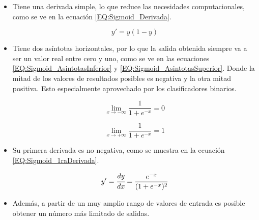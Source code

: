             \begin{itemize}
                \item Tiene una derivada simple, lo que reduce las necesidades computacionales, como se ve en la ecuación \ref{EQ:Sigmoid_Derivada}.
            
                \begin{equation}
                    \label{EQ:Sigmoid_Derivada}
                    y' = y(1 - y)
                \end{equation}
                
                \item Tiene dos asíntotas horizontales, por lo que la salida obtenida siempre va a ser un valor real entre cero y uno, como se ve en las ecuaciones \ref{EQ:Sigmoid_AsintotasInferior} y \ref{EQ:Sigmoid_AsintotasSuperior}. Donde la mitad de los valores de resultados posibles es negativa y la otra mitad positiva. Esto especialmente aprovechado por los clasificadores binarios.
                
                \begin{equation}
                    \label{EQ:Sigmoid_AsintotasInferior}
                    \lim _{x\to -\infty }{\frac {1}{1+e^{-x}}}=0
                \end{equation}
                
                \begin{equation}
                    \label{EQ:Sigmoid_AsintotasSuperior}
                    \lim _{x\to +\infty }{\frac {1}{1+e^{-x}}}=1
                \end{equation}
                
                \item Su primera derivada es no negativa, como se muestra en la ecuación \ref{EQ:Sigmoid_1raDerivada}.
                
                \begin{equation}
                    \label{EQ:Sigmoid_1raDerivada}
                    y' = {\cfrac {dy}{dx}}={\frac {e^{-x}}{(1+e^{-x})^{2}}}
                \end{equation}
            
                \item Además, a partir de un muy amplio rango de valores de entrada es posible obtener un número más limitado de salidas.
                
            \end{itemize}
        

